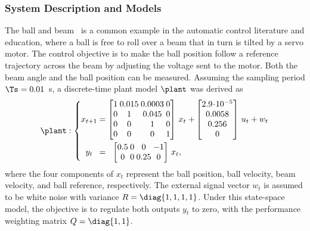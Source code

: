 \subsubsection*{System Description and Models}
The ball and beam~\cite{Wellstead:1978} is a common example in the automatic control literature and education, where a ball is free to roll over a beam that in turn is tilted by a servo motor.
The control objective is to make the ball position follow a reference trajectory across the beam by adjusting the voltage sent to the motor. Both the beam angle and the ball position can be measured.
Assuming the sampling period $\Ts = 0.01$~s, a discrete-time plant model $\plant$ was derived as
%
\begin{equation*}
\setlength\arraycolsep{1.25pt}
    \label{eq:bnb-plant}
    \plant : 
    \left\{
    \begin{matrix}
        x_{t+1} &=& 
        \begin{bmatrix}
            1 & 0.015 & 0.0003 & 0\\
            0 & 1 & 0.045 & 0\\
            0 & 0 & 1 & 0 \\
            0 & 0 & 0 & 1
        \end{bmatrix}\,x_t &+ 
        \begin{bmatrix}
            2.9\!\cdot\!10^{-5} \\
            0.0058 \\
            0.256 \\
            0
        \end{bmatrix}\,u_t + w_t \\ \vspace{-3mm} \\
        y_t &=& 
        \begin{bmatrix}
            0.5 & 0 & 0 & -1\\
            0 & 0 & 0.25 & 0
        \end{bmatrix}\,x_t, & 
    \end{matrix}
    \right.
\end{equation*}
where the four components of $x_t$ represent the ball position, ball velocity, beam velocity, and ball reference, respectively. The external signal vector $w_t$ is assumed to be white noise with variance $R = \diag{1,1,1,1}$. Under this state-space model, the objective is to regulate both outputs $y_t$ to zero, with the performance weighting matrix $Q = \diag{1,1}$.

